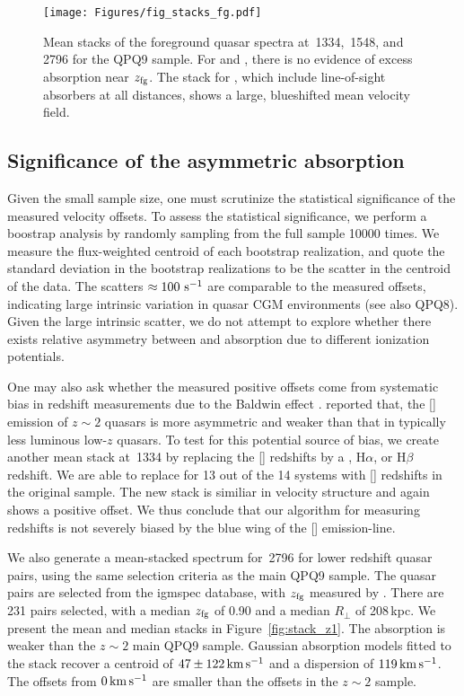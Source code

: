 \documentclass[iop]{emulateapj}
\begin{document}
\begin{figure}
\texttt{[image: Figures/fig\_stacks\_fg.pdf]}
\caption{Mean stacks of the foreground quasar spectra at \,1334, \,1548, and 
\,2796 for the QPQ9 sample. For  and , there is no evidence of 
excess absorption near $z_{\rm fg}$. The stack for , which include line-of-sight 
absorbers at all distances, shows a large, blueshifted mean velocity field.
}
\label{fig:stacks_fg}
\end{figure}

\subsection{Significance of the asymmetric absorption}
\label{sec:significance_+ve}

Given the small sample size, one must scrutinize the statistical significance of the measured 
velocity offsets. To assess the statistical significance, we perform a boostrap analysis by 
randomly sampling from the full sample 10000 times. We measure the flux-weighted centroid of each 
bootstrap realization, and quote the standard deviation in the bootstrap realizations to be the 
scatter in the centroid of the data. The scatters $\approx100\,{\rm \,s^{-1}}$ are comparable 
to the measured offsets, indicating large intrinsic variation in quasar CGM environments (see 
also QPQ8). Given the large intrinsic scatter, we do not attempt to explore whether there exists 
relative asymmetry between  and  absorption due to different ionization 
potentials. 

One may also ask whether the measured positive offsets come from systematic bias in redshift 
measurements due to the Baldwin effect \citep{Baldwin77}. \cite{Shen16} reported that, the 
[] emission of $z\sim2$ quasars is more asymmetric and weaker than that in typically 
less luminous low-$z$ quasars. To test for this potential source of bias, we create another mean 
stack at \,1334 by replacing the [] redshifts by a , H$\alpha$, or 
H$\beta$ redshift. We are able to replace for 13 out of the 14 systems with [] redshifts 
in the original sample. The new stack is similiar in velocity structure and again shows a positive 
offset. We thus conclude that our algorithm for measuring redshifts is not severely biased by 
the blue wing of the [] emission-line. 

We also generate a mean-stacked spectrum for \,2796 for lower redshift quasar pairs, 
using the same selection criteria as the main QPQ9 sample. The quasar pairs are selected from the 
igmspec database, with $z_{\rm fg}$ measured by \cite{HewettWild10}. There are 231 pairs selected, 
with a median $z_{\rm fg}$ of 0.90 and a median $R_\perp$ of 208\,kpc. We present the mean and 
median stacks in Figure~\ref{fig:stack_z1}. The absorption is weaker than the $z\sim2$ main QPQ9 
sample. Gaussian absorption models fitted to the stack recover a centroid of 
$47\pm122\,{\rm km\,s^{-1}}$ and a dispersion of $119\,{\rm km\,s^{-1}}$. The offsets from 
$0\,{\rm km\,s^{-1}}$ are smaller than the offsets in the $z\sim2$ sample. 
\end{document}
